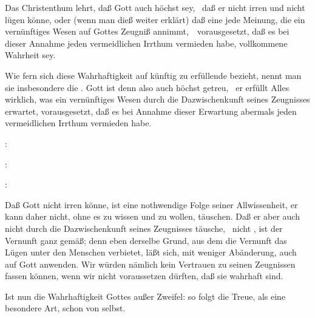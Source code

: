 \begin{aufza}
\item Das Christenthum lehrt, daß Gott auch höchst  sey, \dh\ daß er nicht irren und nicht lügen könne, oder (wenn man dieß weiter erklärt) daß eine jede Meinung, die ein vernünftiges Wesen auf Gottes Zeugniß annimmt,~\ vorausgesetzt, daß es bei dieser Annahme jeden vermeidlichen Irrthum vermieden habe, vollkommene Wahrheit sey.
\item Wie fern sich diese Wahrhaftigkeit auf künftig zu erfüllende  bezieht, nennt man sie insbesondere die . Gott ist denn also auch höchst getreu, \dh\ er erfüllt Alles wirklich, was ein vernünftiges Wesen durch die Dazwischenkunft seines Zeugnisses erwartet, vorausgesetzt, daß es bei Annahme dieser Erwartung abermals jeden vermeidlichen Irrthum vermieden habe.
\end{aufza}

\begin{aufza}
\item {}: 
\item {}: 
\item {}: 
\end{aufza}

\begin{aufza}
\item Daß Gott nicht irren könne, ist eine nothwendige Folge seiner Allwissenheit, er kann daher nicht, ohne es zu wissen und zu wollen, täuschen. Daß er aber auch nicht  durch die Dazwischenkunft seines Zeugnisses täusche, \dh\ nicht , ist der Vernunft ganz gemäß; denn eben derselbe Grund, aus dem die Vernunft das Lügen unter den Menschen verbietet, läßt sich, mit weniger Abänderung, auch auf Gott anwenden. Wir würden nämlich kein Vertrauen zu seinen Zeugnissen fassen können, wenn wir nicht voraussetzen dürften, daß sie wahrhaft sind.
\item Ist nun die Wahrhaftigkeit Gottes außer Zweifel: so folgt die Treue, als eine besondere Art, schon von selbst.~
\end{aufza}

